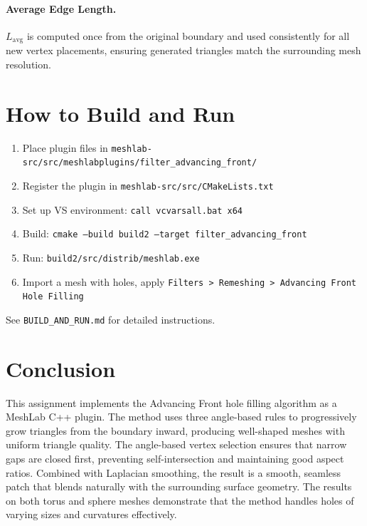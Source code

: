 \documentclass[12pt,a4paper]{article}
\begin{document}
\paragraph{Average Edge Length.}
$L_{\text{avg}}$ is computed once from the original boundary and used consistently for all new vertex placements, ensuring generated triangles match the surrounding mesh resolution.

\section{How to Build and Run}

\begin{enumerate}[leftmargin=2em]
  \item Place plugin files in \texttt{meshlab-src/src/meshlabplugins/filter\_advancing\_front/}
  \item Register the plugin in \texttt{meshlab-src/src/CMakeLists.txt}
  \item Set up VS environment: \texttt{call vcvarsall.bat x64}
  \item Build: \texttt{cmake --build build2 --target filter\_advancing\_front}
  \item Run: \texttt{build2/src/distrib/meshlab.exe}
  \item Import a mesh with holes, apply \texttt{Filters > Remeshing > Advancing Front Hole Filling}
\end{enumerate}

See \texttt{BUILD\_AND\_RUN.md} for detailed instructions.

\section{Conclusion}

This assignment implements the Advancing Front hole filling algorithm as a MeshLab C++ plugin. The method uses three angle-based rules to progressively grow triangles from the boundary inward, producing well-shaped meshes with uniform triangle quality. The angle-based vertex selection ensures that narrow gaps are closed first, preventing self-intersection and maintaining good aspect ratios. Combined with Laplacian smoothing, the result is a smooth, seamless patch that blends naturally with the surrounding surface geometry. The results on both torus and sphere meshes demonstrate that the method handles holes of varying sizes and curvatures effectively.
\end{document}
